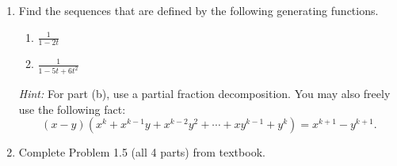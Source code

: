 \documentclass[11pt]{article}%
\theoremstyle{definition}
\begin{document}
\begin{enumerate}
\item Find the sequences that are defined by the following generating functions.
\begin{enumerate}
\item $\displaystyle \frac{1}{1-2t}$
\item $\displaystyle \frac{1}{1-5t+6t^2}$
\end{enumerate}
\emph{Hint:} For part (b), use a partial fraction decomposition.  You may also freely use the following fact:
\[
(x-y)(x^k+x^{k-1}y+x^{k-2}y^2+\cdots +xy^{k-1}+y^k)=x^{k+1}-y^{k+1}.
\]
\item Complete Problem 1.5 (all 4 parts) from textbook.
\end{enumerate}
\end{document}
